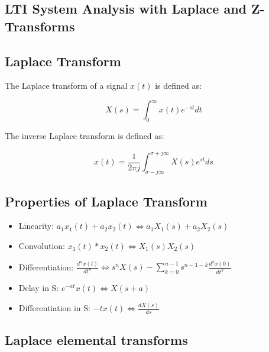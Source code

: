 \documentclass[letterpaper]{article}
\begin{document}
    \begin{multicols}{2}
        \section{LTI System Analysis with Laplace and Z-Transforms}

        \subsection{Laplace Transform}

        The Laplace transform of a signal $x(t)$ is defined as:

        \[X(s) = \int_{0}^{\infty} x(t)e^{-st}dt\]

        The inverse Laplace transform is defined as:

        \[x(t) = \frac{1}{2\pi j} \int_{\sigma - j\infty}^{\sigma + j\infty} X(s)e^{st}ds\]

        \subsection{Properties of Laplace Transform}

        \begin{itemize}
            \item Linearity: $a_1x_1(t) + a_2x_2(t) \Leftrightarrow a_1X_1(s) + a_2X_2(s)$
            \item Convolution: $x_1(t) * x_2(t) \Leftrightarrow X_1(s)X_2(s)$
            \item Differentiation: $\frac{d^n x(t)}{dt^n} \Leftrightarrow s^nX(s) - \sum_{k=0}^{n-1} s^{n-1-k} \frac{d^k x(0)}{dt^k}$
            \item Delay in S: $e^{-at}x(t) \Leftrightarrow X(s+a)$
            \item Differentiation in S: $-tx(t) \Leftrightarrow \frac{dX(s)}{ds}$
        \end{itemize}

        \subsection{Laplace elemental transforms}


\end{multicols}
\end{document}
